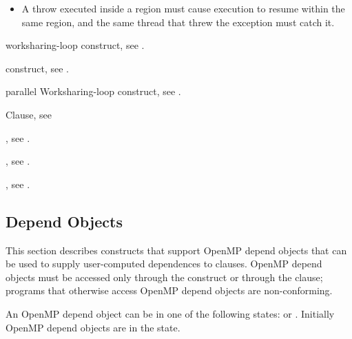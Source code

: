 \begin{cppspecific}
\begin{itemize}
\item A throw executed inside a  region must cause execution to
      resume within the same  region, and the same thread that threw
      the exception must catch it.
\end{itemize}
\end{cppspecific}

\begin{crossrefs}
\item worksharing-loop construct, see
.

\item {} construct, see
.

\item parallel Worksharing-loop construct, see
.

\item {} Clause, see

\item {}, see
.

\item {}, see
.

\item {}, see
.
\end{crossrefs}



\subsection{Depend Objects}
\label{subsec:Depend Object}

This section describes constructs that support OpenMP depend objects that 
can be used to supply user-computed dependences to  clauses. 
OpenMP depend objects must be accessed only through the  
construct or through the  clause; programs that otherwise 
access OpenMP depend objects are non-conforming.

An OpenMP depend object can be in one of the following states: 
 or . Initially OpenMP depend objects 
are in the  state.

